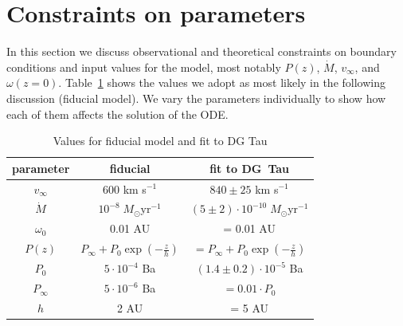 \documentclass{emulateapj}
\begin{document}
\section{Constraints on parameters}
\label{sect:parameters}
In this section we discuss observational and theoretical constraints on boundary conditions and input values for the model, most notably $P(z)$, $\dot M$, $v_\infty$, and $\omega(z=0)$. Table~\ref{tab:fiducial} shows the values we adopt as most likely in the following discussion (fiducial model). We vary the parameters individually to show how each of them affects the solution of the ODE. 
\begin{table}
\label{tab:fiducial}
\caption{Values for fiducial model and fit to DG Tau}
\begin{tabular}{ccc}
\hline\hline
parameter & fiducial & fit to DG~Tau\\
\hline
$v_\infty$ & 600 km s$^{-1}$ & $840\pm25$ km s$^{-1}$\\
$\dot M$ & $10^{-8}\;M_\odot\textrm{yr}^{-1}$ & $(5\pm2)\cdot10^{-10}\;M_\odot\textrm{yr}^{-1}$\\
$\omega_0$ & 0.01 AU & = 0.01 AU\tablenotemark{a}\\
$P(z)$ & $P_\infty+P_0\exp\left(-\frac{z}{h}\right)$ & $=P_\infty+P_0\exp\left(-\frac{z}{h}\right)$\\
$P_0$ & $5\cdot 10^{-4}$ Ba &  $(1.4\pm0.2)\cdot 10^{-5}$ Ba\\
$P_\infty$ & $5\cdot 10^{-6}$ Ba & $=0.01\cdot P_0$\\
$h$ & 2 AU & = 5 AU\tablenotemark{a}\\
\hline
\end{tabular}
\end{table}
\end{document}
